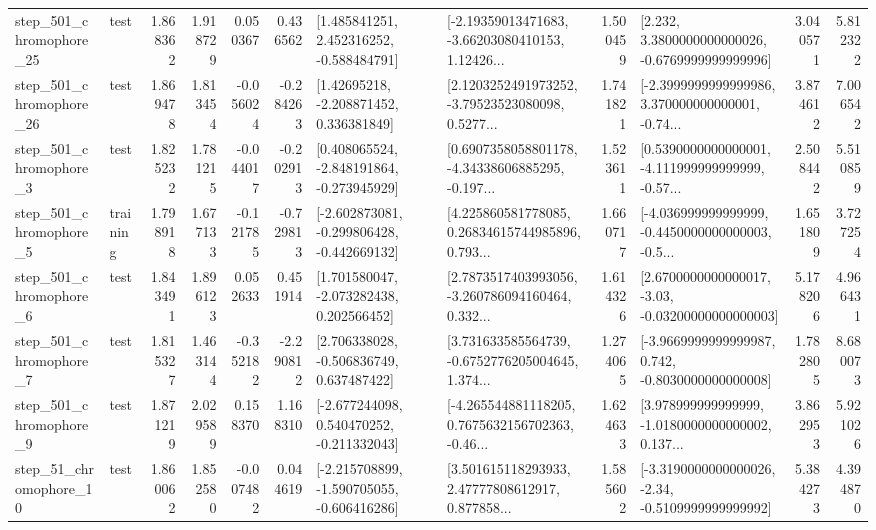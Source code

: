 \begin{tabular}{llrrrrllrlrr}
  step\_501\_chromophore\_25 &      test &      1.868362 &    1.918729 &      0.050367 &  0.436562 &    [1.485841251, 2.452316252, -0.588484791] &  [-2.19359013471683, -3.66203080410153, 1.12426... &       1.500459 &   [2.232, 3.3800000000000026, -0.6769999999999996] &            3.040571 &          5.812322 \\
  step\_501\_chromophore\_26 &      test &      1.869478 &    1.813454 &     -0.056024 & -0.284263 &     [1.42695218, -2.208871452, 0.336381849] &  [2.1203252491973252, -3.79523523080098, 0.5277... &       1.741821 &  [-2.3999999999999986, 3.370000000000001, -0.74... &            3.874612 &          7.006542 \\
   step\_501\_chromophore\_3 &      test &      1.825232 &    1.781215 &     -0.044017 & -0.202913 &   [0.408065524, -2.848191864, -0.273945929] &  [0.6907358058801178, -4.34338606885295, -0.197... &       1.523611 &  [0.5390000000000001, -4.111999999999999, -0.57... &            2.508442 &          5.510859 \\
   step\_501\_chromophore\_5 &  training &      1.798918 &    1.677133 &     -0.121785 & -0.729813 &  [-2.602873081, -0.299806428, -0.442669132] &  [4.225860581778085, 0.26834615744985896, 0.793... &       1.660717 &  [-4.036999999999999, -0.4450000000000003, -0.5... &            1.651809 &          3.727254 \\
   step\_501\_chromophore\_6 &      test &      1.843491 &    1.896123 &      0.052633 &  0.451914 &    [1.701580047, -2.073282438, 0.202566452] &  [2.7873517403993056, -3.260786094160464, 0.332... &       1.614326 &  [2.6700000000000017, -3.03, -0.03200000000000003] &            5.178206 &          4.966431 \\
   step\_501\_chromophore\_7 &      test &      1.815327 &    1.463144 &     -0.352182 & -2.290812 &    [2.706338028, -0.506836749, 0.637487422] &  [3.731633585564739, -0.6752776205004645, 1.374... &       1.274065 &  [-3.9669999999999987, 0.742, -0.8030000000000008] &            1.782805 &          8.680073 \\
   step\_501\_chromophore\_9 &      test &      1.871219 &    2.029589 &      0.158370 &  1.168310 &   [-2.677244098, 0.540470252, -0.211332043] &  [-4.265544881118205, 0.7675632156702363, -0.46... &       1.624633 &  [3.978999999999999, -1.0180000000000002, 0.137... &            3.862953 &          5.921026 \\
   step\_51\_chromophore\_10 &      test &      1.860062 &    1.852580 &     -0.007482 &  0.044619 &  [-2.215708899, -1.590705055, -0.606416286] &  [3.501615118293933, 2.47777808612917, 0.877858... &       1.585602 &  [-3.3190000000000026, -2.34, -0.5109999999999992] &            5.384273 &          4.394870 \\

\end{tabular}

